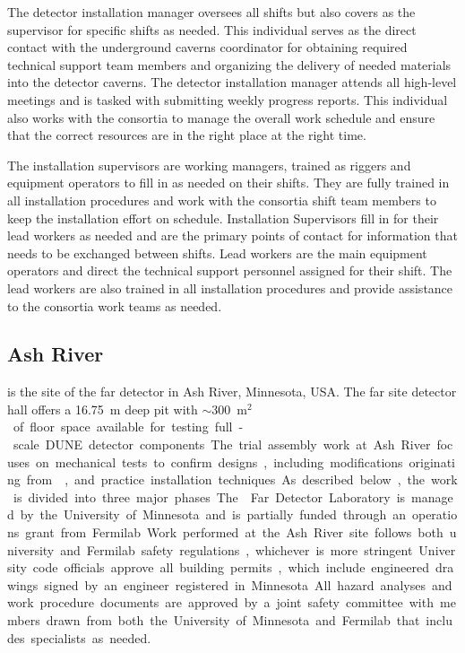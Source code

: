 The detector installation manager oversees all shifts but also 
covers as the supervisor for specific shifts as needed.  This 
individual serves as the direct contact with the underground caverns 
coordinator for obtaining required technical support
team members and organizing the delivery of needed materials 
into the detector caverns.  The detector installation manager 
attends all high-level meetings and is tasked with submitting
weekly progress reports.  This individual also works with the 
 consortia to manage the overall work schedule 
and ensure that the correct resources are in the right place
at the right time. 
    
The installation supervisors are working managers, trained as 
riggers and equipment operators to fill in as needed on their 
shifts.  They are fully trained in all installation procedures
and work with the consortia shift team members to keep the 
installation effort on schedule.  Installation Supervisors 
fill in for their lead workers as needed and are the primary 
points of contact for information that needs to be exchanged 
between shifts.  Lead workers are the main equipment operators 
and direct the technical support personnel assigned for their 
shift.  The lead workers are also trained in all installation 
procedures and provide assistance to the consortia work teams 
as needed.  

\subsection{Ash River}

 is the site of the  far detector in Ash River,
Minnesota, USA. The  far site detector hall offers a \SI{16.75}{m} 
deep pit with $\sim$\SI{300}{m$^2$} of floor space available for 
testing full-scale DUNE detector components.  The trial assembly 
work at Ash River focuses on mechanical tests to confirm designs,
including modifications originating from , 
and practice installation techniques.  As described below, the 
work is divided into three major phases.  The  Far 
Detector Laboratory is managed by the University of Minnesota 
and is partially funded through an operations grant from 
Fermilab.  Work performed at the Ash River site follows both 
university and Fermilab safety regulations, whichever is more 
stringent. University code officials approve all building permits, 
which include engineered drawings signed by an engineer registered 
in Minnesota. All hazard analyses and work procedure documents are 
approved by a joint safety committee with members drawn from both 
the University of Minnesota and Fermilab that includes specialists 
as needed.

